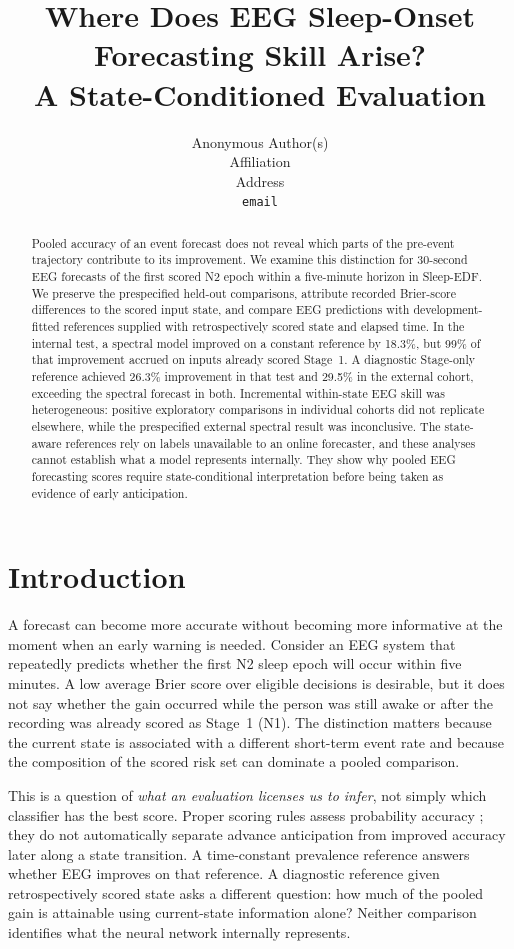 \documentclass{article}
\title{Where Does EEG Sleep-Onset Forecasting Skill Arise?\\ A State-Conditioned Evaluation}
\author{Anonymous Author(s)\\ Affiliation\\ Address\\ \texttt{email}}
\begin{document}
\maketitle

\begin{abstract}
Pooled accuracy of an event forecast does not reveal which parts of the pre-event trajectory contribute to its improvement. We examine this distinction for 30-second EEG forecasts of the first scored N2 epoch within a five-minute horizon in Sleep-EDF. We preserve the prespecified held-out comparisons, attribute recorded Brier-score differences to the scored input state, and compare EEG predictions with development-fitted references supplied with retrospectively scored state and elapsed time. In the internal test, a spectral model improved on a constant reference by 18.3\%, but 99\% of that improvement accrued on inputs already scored Stage~1. A diagnostic Stage-only reference achieved 26.3\% improvement in that test and 29.5\% in the external cohort, exceeding the spectral forecast in both. Incremental within-state EEG skill was heterogeneous: positive exploratory comparisons in individual cohorts did not replicate elsewhere, while the prespecified external spectral result was inconclusive. The state-aware references rely on labels unavailable to an online forecaster, and these analyses cannot establish what a model represents internally. They show why pooled EEG forecasting scores require state-conditional interpretation before being taken as evidence of early anticipation.
\end{abstract}

\section{Introduction}
\label{sec:intro}

A forecast can become more accurate without becoming more informative at the moment when an early warning is needed. Consider an EEG system that repeatedly predicts whether the first N2 sleep epoch will occur within five minutes. A low average Brier score over eligible decisions is desirable, but it does not say whether the gain occurred while the person was still awake or after the recording was already scored as Stage~1 (N1). The distinction matters because the current state is associated with a different short-term event rate and because the composition of the scored risk set can dominate a pooled comparison.

This is a question of \emph{what an evaluation licenses us to infer}, not simply which classifier has the best score. Proper scoring rules assess probability accuracy \citep{brier1950,gneiting2007scoring}; they do not automatically separate advance anticipation from improved accuracy later along a state transition. A time-constant prevalence reference answers whether EEG improves on that reference. A diagnostic reference given retrospectively scored state asks a different question: how much of the pooled gain is attainable using current-state information alone? Neither comparison identifies what the neural network internally represents.
\end{document}
